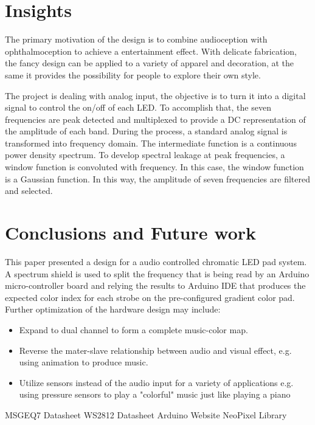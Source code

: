\documentclass[12pt,a4paper,journal]{IEEEtran}
\begin{document}
\section{Insights}
The primary motivation of the design is to combine audioception with ophthalmoception to achieve a entertainment effect. With delicate fabrication, the fancy design can be applied to a variety of apparel and decoration, at the same it provides the possibility for people to explore their own style.

The project is dealing with analog input, the objective is to turn it into a digital signal to control the on/off of each LED. To accomplish that, the seven frequencies are peak detected and multiplexed to provide a DC representation of the amplitude of each band. During the process, a standard analog signal is transformed into frequency domain. The intermediate function is a continuous power density spectrum. To develop spectral leakage at peak frequencies, a window function is convoluted with frequency. In this case, the window function is a Gaussian function. In this way, the amplitude of seven frequencies are filtered and selected.
\section{Conclusions and Future work}
This paper presented a design for a audio controlled chromatic LED pad system. A spectrum shield is used to split the frequency that is being read by an Arduino micro-controller board and relying the results to Arduino IDE that produces the expected color index for each strobe on the pre-configured gradient color pad.
Further optimization of the hardware design may include: 
\begin{itemize}
\item Expand to dual channel to form a complete music-color map. 
\item Reverse the mater-slave relationship between audio and visual effect, e.g. using animation to produce music.
\item Utilize sensors instead of the audio input for a variety of applications e.g. using pressure sensors to play a "colorful" music just like playing a piano
\end{itemize}

\ifCLASSOPTIONcaptionsoff
  \newpage
\fi

\begin{thebibliography}{1}

MSGEQ7 Datasheet
WS2812 Datasheet
Arduino Website
NeoPixel Library

\end{thebibliography}
\end{document}
